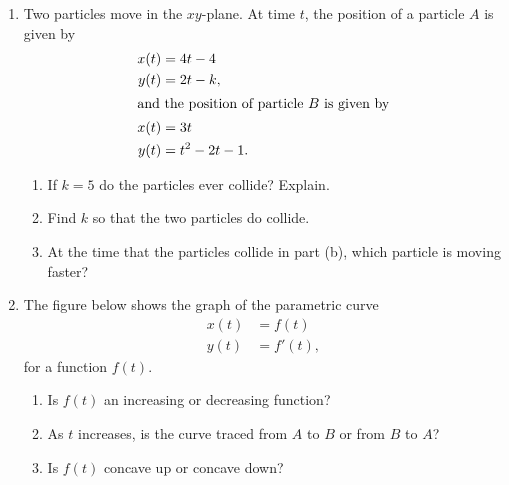 \documentclass[11pt]{article}
\begin{document}
\begin{enumerate}
\item Two particles move in the $xy$-plane.  At time $t$, the position
  of a particle $A$ is given by
  \begin{align*}
    x(t) &= 4t - 4\\
    y(t) &= 2t - k,\\
    \intertext{and the position of particle $B$ is given by}
    x(t) &= 3t\\
    y(t) &= t^2 - 2t - 1.
  \end{align*}

  \begin{enumerate}
  \item If $k=5$ do the particles ever collide?  Explain.
    \vfill
  \item Find $k$ so that the two particles do collide.
    \vfill
  \item At the time that the particles collide in part (b), which
    particle is moving faster?
    \vfill
  \end{enumerate}
  \newpage

\item The figure below shows the graph of the parametric curve
  \begin{align*}
    x(t) &= f(t)\\
    y(t) &= f'(t),
  \end{align*}
  for a function $f(t)$.
    \begin{center}
  \end{center}

  \begin{enumerate}
  \item Is $f(t)$ an increasing or decreasing function?
    \vfill
  \item As $t$ increases, is the curve traced from $A$ to $B$ or from
    $B$ to $A$?
    \vfill
  \item Is $f(t)$ concave up or concave down?
    \vfill
  \end{enumerate}


\end{enumerate}
\end{document}
